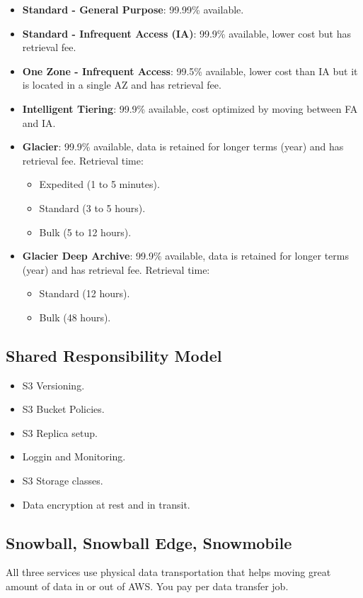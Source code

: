 \begin{itemize}
	\item{\textbf{Standard - General Purpose}: 99.99\% available.}
	\item{\textbf{Standard - Infrequent Access (IA)}: 99.9\% available, lower cost but has retrieval fee.}
	\item{\textbf{One Zone - Infrequent Access}: 99.5\% available, lower cost than IA but it is located in a single AZ and has retrieval fee.}
	\item{\textbf{Intelligent Tiering}: 99.9\% available, cost optimized by moving between FA and IA.}
	\item{\textbf{Glacier}: 99.9\% available, data is retained for longer terms (year) and has retrieval fee. Retrieval time:}
	\begin{itemize}
		\item{Expedited (1 to 5 minutes).}
		\item{Standard (3 to 5 hours).}
		\item{Bulk (5 to 12 hours).}
	\end{itemize}
	\item{\textbf{Glacier Deep Archive}: 99.9\% available, data is retained for longer terms (year) and has retrieval fee. Retrieval time:}
	\begin{itemize}
		\item{Standard (12 hours).}
		\item{Bulk (48 hours).}
	\end{itemize}
\end{itemize}

\subsection{Shared Responsibility Model}
\begin{itemize}
	\item{S3 Versioning.}
	\item{S3 Bucket Policies.}
	\item{S3 Replica setup.}
	\item{Loggin and Monitoring.}
	\item{S3 Storage classes.}
	\item{Data encryption at rest and in transit.}
\end{itemize}

\subsection{Snowball, Snowball Edge, Snowmobile}
All three services use physical data transportation that helps moving great amount of data in or out of AWS. You pay per data transfer job.

